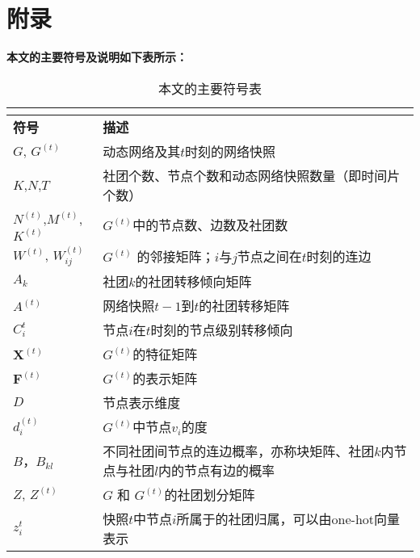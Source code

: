 
\appendix

\chapter*{附录}


\textbf{本文的主要符号及说明如下表所示：}
\begin{center}
	\begin{longtable}{@{}lp{300pt}@{}}
		\caption{本文的主要符号表}\\
		\label{symbols:all}\\
			\hline
			{\bfseries 符号} &  { \bfseries 描述} \\
			\hline
			$G$, $G^{(t)}$ &  动态网络及其$t$时刻的网络快照 \\
			$K$,$N$,$T$ & 社团个数、节点个数和动态网络快照数量（即时间片个数） \\
			$N^{(t)}$,$M^{(t)}$, $K^{(t)}$ &  $G^{(t)}$中的节点数、边数及社团数 \\
			$W^{(t)}$, $W^{(t)}_{ij}$ &  $G^{(t)}$ 的邻接矩阵；$i$与$j$节点之间在$t$时刻的连边\\
			${A}_k$ & 社团$k$的社团转移倾向矩阵 \\
			$A^{(t)}$ &  网络快照$t-1$到$t$的社团转移矩阵 \\
			${C}_i^{t}$ & 节点$i$在$t$时刻的节点级别转移倾向\\
			$\mathbf{X}^{(t)}$ & $G^{(t)}$的特征矩阵 \\
			$\mathbf{F}^{(t)}$ & $G^{(t)}$的表示矩阵 \\
			$D$ & 节点表示维度 \\
			$d^{(t)}_i$ & $G^{(t)}$中节点$v_i$的度 \\
			$B$，$B_{kl}$ & 不同社团间节点的连边概率，亦称块矩阵、社团$k$内节点与社团$l$内的节点有边的概率\\
			$Z$, $Z^{(t)}$ & $G$ 和 $G^{(t)}$的社团划分矩阵 \\
			$z_i^{t}$ & 快照$t$中节点$i$所属于的社团归属，可以由one-hot向量表示 \\

\end{longtable}
\end{center}
